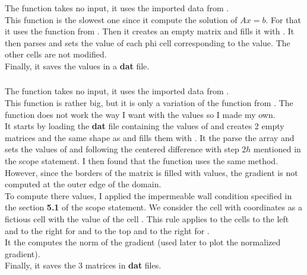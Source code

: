 \subsubsection{\textcolor{func}{}}
The function \textcolor{func}{} takes no input, it uses the imported data from
.\\
This function is the slowest one since it compute the solution of $Ax = b$. For
that it uses the function  from . Then it creates
an empty matrix  and fills it with . It then parses
 and sets the value of each phi cell corresponding to the  value.
The other cells are not modified.\\
Finally, it saves the values in a \textbf{dat} file.

\subsubsection{\textcolor{func}{}}
The function \textcolor{func}{} takes no input, it uses the imported data
from .\\
This function is rather big, but it is only a variation of the 
function from . The function  does not work
the way I want with the  values so I made my own.\\
It starts by loading the \textbf{dat} file containing the values of 
and creates 2 empty matrices  and  the same shape as
 and fills them with . It the parse the 
array and sets the values of  and  following the centered
difference with step $2h$ mentioned in the scope statement. I then found that
the function  uses the same method. However, since the
borders of the matrix  is filled with  values, the
gradient is not computed at the outer edge of the domain.\\
To compute there values, I applied the impermeable wall condition specified in
the section \textbf{5.1} of the scope statement. We consider the 
 cell with coordinates \py{[i - 1, j]} as a fictious cell with
the value of the cell \py{[i, j]}. This rule applies to the cells to the left
and to the right for  and to the top and to the right for
.\\
It the computes the norm of the gradient (used later to plot the normalized
gradient).\\
Finally, it saves the 3 matrices in \textbf{dat} files.

